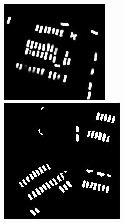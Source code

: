 \documentclass{kththesis}
\begin{document}
\begin{figure}[H]
  \includegraphics[width=\linewidth]{gan_vs_class/gan_1}
\endminipage\hfill
\caption*{ }
  \includegraphics[width=\linewidth]{gan_vs_class/label_2}
\endminipage\hfill
{}

\end{figure}
\end{document}
